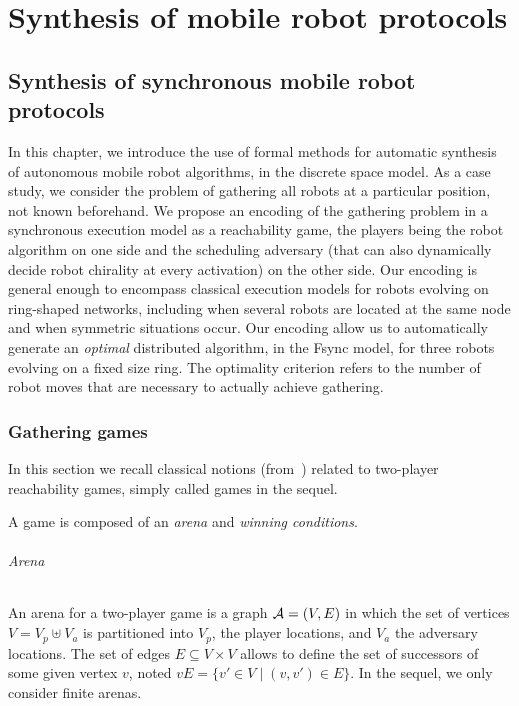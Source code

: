 
\part{Synthesis of mobile robot protocols}
\label{part:synth}

\chapter[Synchronous Synthesis]{Synthesis of synchronous mobile robot protocols}
\label{chap:synth}

In this chapter, we introduce the use of formal methods for automatic synthesis of autonomous mobile robot algorithms, in the discrete space model. As a case study, we consider the problem of gathering all robots at a particular position, not known beforehand. 
We propose an encoding of the gathering problem in a synchronous execution model as a reachability game, the players being the robot algorithm on one side and the scheduling adversary (that can also dynamically decide robot chirality at every activation) on the other side. Our encoding is general enough to encompass classical execution models for robots evolving on ring-shaped networks, including when several robots are located at the same node and when symmetric situations occur. Our encoding allow us to automatically generate an \emph{optimal} distributed algorithm, in the Fsync model, for three robots evolving on a fixed size ring. The optimality criterion refers to the number of robot moves that are necessary to actually achieve gathering.

\section {Gathering games}
\label{sec:jeux}
In this section we recall classical notions (from~\cite{DBLP:conf/dagstuhl/Mazala01}) related to two-player reachability games,  simply called games in the sequel. 

A game is composed of an \emph{arena} and \emph{winning conditions}.

\paragraph{Arena} An arena for a two-player game is a graph $\mathcal{A}=(V, E)$ in which the set of vertices
$V=V_p\uplus V_a$ is partitioned into $V_p$, the player locations, and $V_a$
the adversary locations. The set of edges $E\subseteq V\times V$ allows to
define the set of successors of some given vertex $v$, noted $vE=\{v'\in V\mid
(v, v')\in E\}$. %
In the sequel, we only consider finite arenas.

